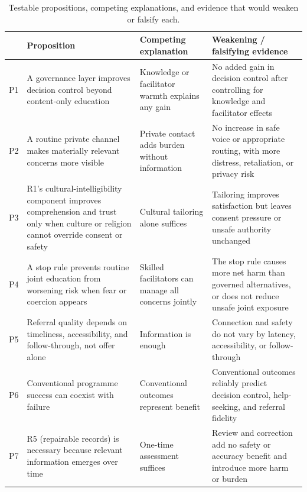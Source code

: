 \begin{table}[t]
\centering\footnotesize
\caption{Testable propositions, competing explanations, and evidence that would weaken or falsify each.}
\label{tab:props}
\begin{tabularx}{\textwidth}{@{}p{0.6cm}YYY@{}}
\toprule
& \textbf{Proposition} & \textbf{Competing explanation} & \textbf{Weakening / falsifying evidence}\\
\midrule
P1 & A governance layer improves decision control beyond content-only education & Knowledge or
facilitator warmth explains any gain & No added gain in decision control after controlling for
knowledge and facilitator effects\\
P2 & A routine private channel makes materially relevant concerns more visible & Private contact adds
burden without information & No increase in safe voice or appropriate routing, with more distress,
retaliation, or privacy risk\\
P3 & R1's cultural-intelligibility component improves comprehension and trust only when culture or
religion cannot override consent or safety & Cultural tailoring alone suffices & Tailoring improves
satisfaction but leaves consent pressure or unsafe authority unchanged\\
P4 & A stop rule prevents routine joint education from worsening risk when fear or coercion appears &
Skilled facilitators can manage all concerns jointly & The stop rule causes more net harm than
governed alternatives, or does not reduce unsafe joint exposure\\
P5 & Referral quality depends on timeliness, accessibility, and follow-through, not offer alone &
Information is enough & Connection and safety do not vary by latency, accessibility, or
follow-through\\
P6 & Conventional programme success can coexist with \tphe{} failure & Conventional outcomes
represent benefit & Conventional outcomes reliably predict decision control, help-seeking, and
referral fidelity\\
P7 & R5 (repairable records) is necessary because relevant information emerges over time & One-time
assessment suffices & Review and correction add no safety or accuracy benefit and introduce more harm
or burden\\
\bottomrule
\end{tabularx}
\end{table}
